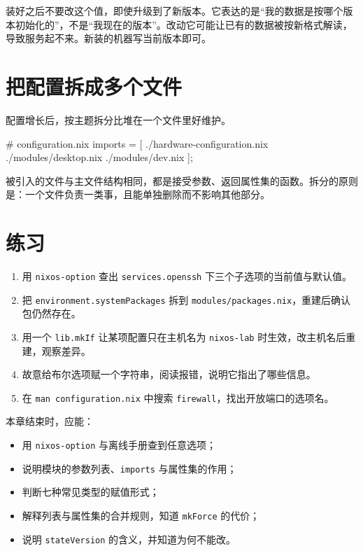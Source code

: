 装好之后不要改这个值，即使升级到了新版本。它表达的是“我的数据是按哪个版本初始化的”，不是“我现在的版本”。改动它可能让已有的数据被按新格式解读，导致服务起不来。新装的机器写当前版本即可。

\section{把配置拆成多个文件}

配置增长后，按主题拆分比堆在一个文件里好维护。

\begin{nixcode}
# configuration.nix
{
  imports = [
    ./hardware-configuration.nix
    ./modules/desktop.nix
    ./modules/dev.nix
  ];
}
\end{nixcode}

被引入的文件与主文件结构相同，都是接受参数、返回属性集的函数。拆分的原则是：一个文件负责一类事，且能单独删除而不影响其他部分。

\section{练习}

\begin{enumerate}
  \item 用 \texttt{nixos-option} 查出 \texttt{services.openssh} 下三个子选项的当前值与默认值。
  \item 把 \texttt{environment.\allowbreak{}systemPackages} 拆到 \texttt{modules/\allowbreak{}packages.nix}，重建后确认包仍然存在。
  \item 用一个 \texttt{lib.mkIf} 让某项配置只在主机名为 \texttt{nixos-lab} 时生效，改主机名后重建，观察差异。
  \item 故意给布尔选项赋一个字符串，阅读报错，说明它指出了哪些信息。
  \item 在 \texttt{man configuration.nix} 中搜索 \texttt{firewall}，找出开放端口的选项名。
\end{enumerate}

\begin{checkpoint}
本章结束时，应能：
\begin{itemize}
  \item 用 \texttt{nixos-option} 与离线手册查到任意选项；
  \item 说明模块的参数列表、\texttt{imports} 与属性集的作用；
  \item 判断七种常见类型的赋值形式；
  \item 解释列表与属性集的合并规则，知道 \texttt{mkForce} 的代价；
  \item 说明 \texttt{stateVersion} 的含义，并知道为何不能改。
\end{itemize}
\end{checkpoint}

